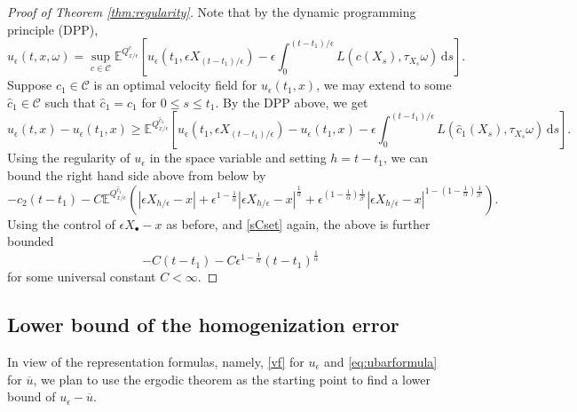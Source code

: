 \documentclass[11pt,reqno]{amsart}
\theoremstyle{definition}
\theoremstyle{remark}
\numberwithin{equation}{section}
\newcommand{\eps}{\epsilon}
\newcommand{\R}{{\mathbb{R}}}
\begin{document}
\begin{proof}[Proof of Theorem \ref{thm:regularity}]
Note that by the dynamic programming principle (DPP),
\begin{equation*}
    u_\eps(t,x,\omega) = \sup_{c\in \mathscr{C}} \mathbb{E}^{Q^c_{x/\eps}} \left[ u_\eps(t_1,\eps X_{(t-t_1)/\eps}) - \eps\int_0^{(t-t_1)/\eps} L(c(X_s),\tau_{X_s}\omega)\,\mathrm{d}s\right].
\end{equation*}
Suppose $c_1\in \mathscr{C}$ is an optimal velocity field for $u_\eps(t_1,x)$, we may extend to some $\hat{c}_1\in \mathscr{C}$ such that $\hat c_1 = c_1$ for $0\le s\le t_1$. By the DPP above, we get
\begin{equation*}
    u_\eps(t,x)-u_\eps(t_1,x) \ge \mathbb{E}^{Q^{\hat{c}_1}_{x/\eps}} \left[u_\eps(t_1,\eps X_{(t-t_1)/\eps}) - u_\eps(t_1,x) - \eps\int_0^{(t-t_1)/\eps} L(\hat{c}_1(X_s),\tau_{X_s}\omega)\,\mathrm{d}s\right].
    \end{equation*}
Using the regularity of $u_\eps$ in the space variable and setting $h=t-t_1$, we can bound the right hand side above from below by
    \begin{equation*}
    -c_2(t-t_1) - C\mathbb{E}^{Q^{\hat{c}_1}_{x/\eps}}\left(|\eps X_{h/\eps}-x| +\eps^{1-\frac1\alpha} |\eps X_{h/\eps}-x|^{\frac1\alpha} + \eps^{(1-\frac1\alpha)\frac{1}{\beta'}} |\eps X_{h/\eps}-x|^{1-(1-\frac1\alpha)\frac{1}{\beta'}}\right).
\end{equation*}
Using the control of $\eps X_\bullet -x$ as before, and \eqref{sCset} again, the above is further bounded
\begin{equation*}
-C(t-t_1)-C\eps^{1-\frac1\alpha}(t-t_1)^{\frac1\alpha}
\end{equation*}
for some universal constant $C<\infty$.
\end{proof}

\subsection{Lower bound of the homogenization error}

In view of the representation formulas, namely, \eqref{vf} for $u_\eps$ and \eqref{eq:ubarformula} for $\overline{u}$, we plan to use the ergodic theorem as the starting point to find a lower bound of $u_\eps-\overline{u}$. %
\end{document}
